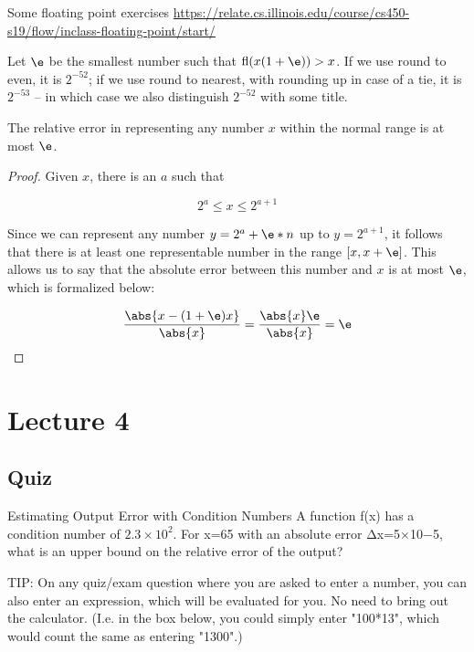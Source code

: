 \documentclass[../main.tex]{subfiles}
\begin{document}
\begin{remark}
    Some floating point exercises \url{https://relate.cs.illinois.edu/course/cs450-s19/flow/inclass-floating-point/start/}
\end{remark}

\begin{definition}
    Let $\e$ be the smallest number such that $\text{fl}(x(1 + \e)) > x$. If we use round to even, it is $2^{-52}$; if we use round to nearest,
    with rounding up in case of a tie, it is $2^{-53}$ -- in which case we also distinguish $2^{-52}$ with some title.
\end{definition}

\begin{lemma}
    The relative error in representing any number $x$ within the normal range is at most $\e$.
\end{lemma}

\begin{proof}
    Given $x$, there is an $a$ such that

    \[
        2^{a} \leq x \leq 2^{a+1}
    \]

    Since we can represent any number $y = 2^{a} + \e * n$ up
    to $y = 2^{a+1}$, it follows that there is at least one representable number in the range $[x, x + \e]$. This allows us to say that the absolute error between this number and $x$ is at most $\e$, which is formalized below:


    \[
        \frac{\abs{x - (1 + \e)x}}{\abs{x}} = \frac{\abs{x} \e}{\abs{x}} = \e
    \]
\end{proof}

\section{Lecture 4}

\subsection{Quiz}
Estimating Output Error with Condition Numbers
A function f(x) has a condition number of $2.3×10^2$. For x=65 with an absolute error Δx=5×10−5, what is an upper bound on the relative error of the output?

TIP: On any quiz/exam question where you are asked to enter a number, you can also enter an expression, which will be evaluated for you. No need to bring out the calculator. (I.e. in the box below, you could simply enter "100*13", which would count the same as entering "1300".)
\end{document}

